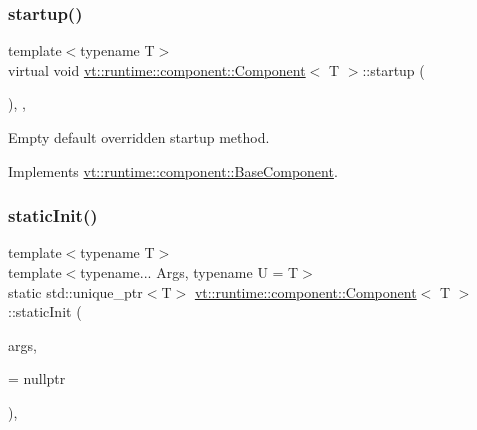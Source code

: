 \mbox{\label{structvt_1_1runtime_1_1component_1_1_component_aad3974307ab3b2e1df389a91310f68c2}} 
\subsubsection{\texorpdfstring{startup()}{startup()}}
{\footnotesize\ttfamily template$<$typename T$>$ \\
virtual void \hyperlink{structvt_1_1runtime_1_1component_1_1_component}{vt\+::runtime\+::component\+::\+Component}$<$ T $>$\+::startup (\begin{DoxyParamCaption}{ }\end{DoxyParamCaption})\hspace{0.3cm}{\ttfamily [inline]}, {\ttfamily [override]}, {\ttfamily [virtual]}}



Empty default overridden startup method. 



Implements \hyperlink{structvt_1_1runtime_1_1component_1_1_base_component_a8bf92f9f0a7027abf7deaefa2e7f5202}{vt\+::runtime\+::component\+::\+Base\+Component}.

\mbox{\label{structvt_1_1runtime_1_1component_1_1_component_a7d82b061566ef21d6438f4701ae6b733}} 
\subsubsection{\texorpdfstring{static\+Init()}{staticInit()}\hspace{0.1cm}{\footnotesize\ttfamily [1/2]}}
{\footnotesize\ttfamily template$<$typename T$>$ \\
template$<$typename... Args, typename U  = T$>$ \\
static std\+::unique\+\_\+ptr$<$T$>$ \hyperlink{structvt_1_1runtime_1_1component_1_1_component}{vt\+::runtime\+::component\+::\+Component}$<$ T $>$\+::static\+Init (\begin{DoxyParamCaption}\item[{Args \&\&...}]{args,  }\item[{\hyperlink{structvt_1_1runtime_1_1component_1_1_component_aca5f3a7c1db697b6d0ba70de7ff8b887}{has\+Cons}$<$ U $>$ $\ast$}]{ = {\ttfamily nullptr} }\end{DoxyParamCaption})\hspace{0.3cm}{\ttfamily [inline]}, {\ttfamily [static]}}



